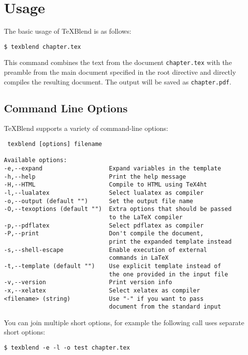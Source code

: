 \section{Usage}

The basic usage of \TeX Blend is as follows:

\begin{verbatim}
$ texblend chapter.tex
\end{verbatim}

This command combines the text from the document \texttt{chapter.tex} with the preamble
from the main document specified in the root directive and directly compiles
the resulting document. The output will be saved as \texttt{chapter.pdf}.

\subsection{Command Line Options}

TeXBlend supports a variety of command-line options:

\begin{verbatim}
 texblend [options] filename

Available options:
-e,--expand                   Expand variables in the template
-h,--help                     Print the help message
-H,--HTML                     Compile to HTML using TeX4ht
-l,--lualatex                 Select lualatex as compiler 
-o,--output (default "")      Set the output file name
-O,--texoptions (default "")  Extra options that should be passed 
                              to the LaTeX compiler
-p,--pdflatex                 Select pdflatex as compiler 
-P,--print                    Don't compile the document, 
                              print the expanded template instead
-s,--shell-escape             Enable execution of external 
                              commands in LaTeX
-t,--template (default "")    Use explicit template instead of 
                              the one provided in the input file
-v,--version                  Print version info
-x,--xelatex                  Select xelatex as compiler 
<filename> (string)           Use "-" if you want to pass 
                              document from the standard input
\end{verbatim}

You can join multiple short options, for example the following call uses separate short options:

\begin{verbatim}
$ texblend -e -l -o test chapter.tex
\end{verbatim}

